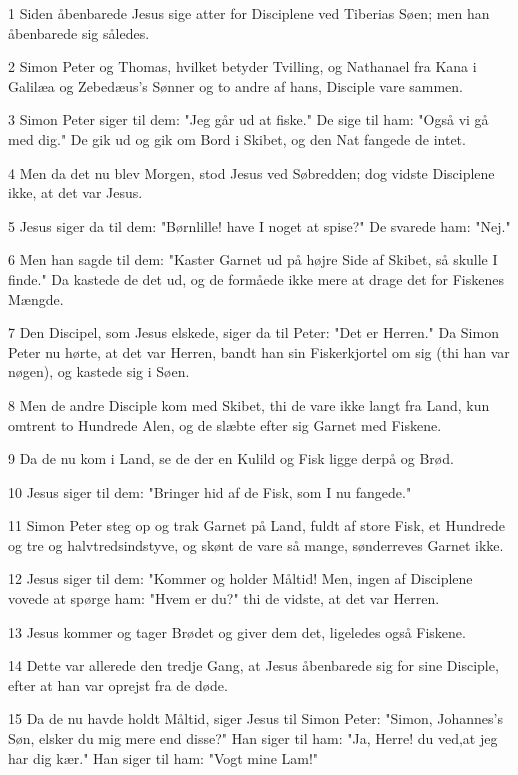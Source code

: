 \par 1 Siden åbenbarede Jesus sige atter for Disciplene ved Tiberias Søen; men han åbenbarede sig således.
\par 2 Simon Peter og Thomas, hvilket betyder Tvilling, og Nathanael fra Kana i Galilæa og Zebedæus's Sønner og to andre af hans, Disciple vare sammen.
\par 3 Simon Peter siger til dem: "Jeg går ud at fiske." De sige til ham: "Også vi gå med dig." De gik ud og gik om Bord i Skibet, og den Nat fangede de intet.
\par 4 Men da det nu blev Morgen, stod Jesus ved Søbredden; dog vidste Disciplene ikke, at det var Jesus.
\par 5 Jesus siger da til dem: "Børnlille! have I noget at spise?" De svarede ham: "Nej."
\par 6 Men han sagde til dem: "Kaster Garnet ud på højre Side af Skibet, så skulle I finde." Da kastede de det ud, og de formåede ikke mere at drage det for Fiskenes Mængde.
\par 7 Den Discipel, som Jesus elskede, siger da til Peter: "Det er Herren." Da Simon Peter nu hørte, at det var Herren, bandt han sin Fiskerkjortel om sig (thi han var nøgen), og kastede sig i Søen.
\par 8 Men de andre Disciple kom med Skibet, thi de vare ikke langt fra Land, kun omtrent to Hundrede Alen, og de slæbte efter sig Garnet med Fiskene.
\par 9 Da de nu kom i Land, se de der en Kulild og Fisk ligge derpå og Brød.
\par 10 Jesus siger til dem: "Bringer hid af de Fisk, som I nu fangede."
\par 11 Simon Peter steg op og trak Garnet på Land, fuldt af store Fisk, et Hundrede og tre og halvtredsindstyve, og skønt de vare så mange, sønderreves Garnet ikke.
\par 12 Jesus siger til dem: "Kommer og holder Måltid! Men, ingen af Disciplene vovede at spørge ham: "Hvem er du?" thi de vidste, at det var Herren.
\par 13 Jesus kommer og tager Brødet og giver dem det, ligeledes også Fiskene.
\par 14 Dette var allerede den tredje Gang, at Jesus åbenbarede sig for sine Disciple, efter at han var oprejst fra de døde.
\par 15 Da de nu havde holdt Måltid, siger Jesus til Simon Peter: "Simon, Johannes's Søn, elsker du mig mere end disse?" Han siger til ham: "Ja, Herre! du ved,at jeg har dig kær." Han siger til ham: "Vogt mine Lam!"
